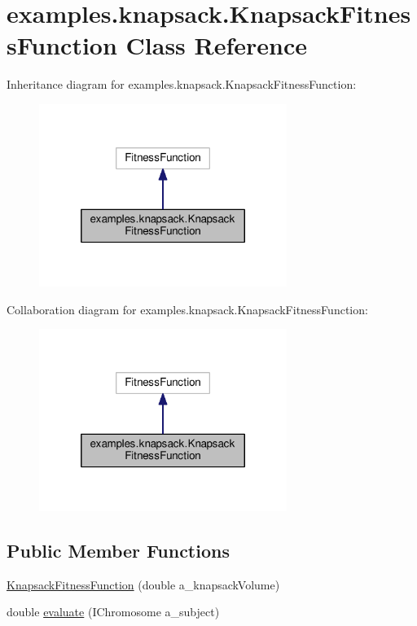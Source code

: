 \hypertarget{classexamples_1_1knapsack_1_1_knapsack_fitness_function}{\section{examples.\-knapsack.\-Knapsack\-Fitness\-Function Class Reference}
\label{classexamples_1_1knapsack_1_1_knapsack_fitness_function}
}


Inheritance diagram for examples.\-knapsack.\-Knapsack\-Fitness\-Function\-:
\nopagebreak
\begin{figure}[H]
\begin{center}
\leavevmode
\includegraphics[width=228pt]{classexamples_1_1knapsack_1_1_knapsack_fitness_function__inherit__graph}
\end{center}
\end{figure}


Collaboration diagram for examples.\-knapsack.\-Knapsack\-Fitness\-Function\-:
\nopagebreak
\begin{figure}[H]
\begin{center}
\leavevmode
\includegraphics[width=228pt]{classexamples_1_1knapsack_1_1_knapsack_fitness_function__coll__graph}
\end{center}
\end{figure}
\subsection*{Public Member Functions}
\begin{DoxyCompactItemize}
\item 
\hyperlink{classexamples_1_1knapsack_1_1_knapsack_fitness_function_a74d93b0e78bd322b56e751c1bae51582}{Knapsack\-Fitness\-Function} (double a\-\_\-knapsack\-Volume)
\item 
double \hyperlink{classexamples_1_1knapsack_1_1_knapsack_fitness_function_a8d003722d94dff21269c417e3691025b}{evaluate} (I\-Chromosome a\-\_\-subject)
\end{DoxyCompactItemize}
